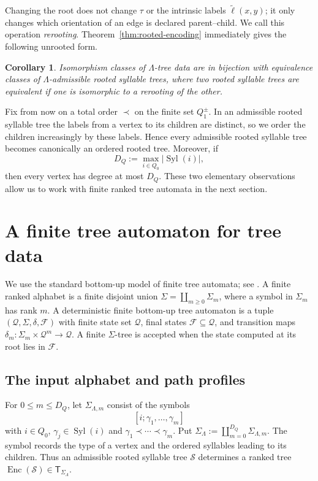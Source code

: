 \documentclass[11pt,a4paper]{amsart}
\newcommand{\Syl}{\operatorname{Syl}}
\newcommand{\Enc}{\operatorname{Enc}}
\theoremstyle{definition}
\theoremstyle{plain}
\newtheorem{corollary}[definition]{Corollary}
\theoremstyle{remark}
\numberwithin{equation}{section}
\begin{document}
Changing the root does not change $\tau$ or the intrinsic labels $\widetilde\ell(x,y)$; it only changes which orientation of an edge is declared parent--child. We call this operation \emph{rerooting}. Theorem~\ref{thm:rooted-encoding} immediately gives the following unrooted form.

\begin{corollary}\label{cor:rerooting}
Isomorphism classes of $\Lambda$-tree data are in bijection with equivalence classes of $\Lambda$-admissible rooted syllable trees, where two rooted syllable trees are equivalent if one is isomorphic to a rerooting of the other.
\end{corollary}

Fix from now on a total order $\prec$ on the finite set $Q_1^{\pm}$. In an admissible rooted syllable tree the labels from a vertex to its children are distinct, so we order the children increasingly by these labels. Hence every admissible rooted syllable tree becomes canonically an ordered rooted tree. Moreover, if
\[
D_Q:=\max_{i\in Q_0}|\Syl(i)|,
\]
then every vertex has degree at most $D_Q$. These two elementary observations allow us to work with finite ranked tree automata in the next section.

\section{A finite tree automaton for tree data}
\label{sec:automaton}

We use the standard bottom-up model of finite tree automata; see \cite{TATA}. A finite ranked alphabet is a finite disjoint union $\Sigma=\coprod_{m\geq 0}\Sigma_m$, where a symbol in $\Sigma_m$ has rank $m$. A deterministic finite bottom-up tree automaton is a tuple $(\mathcal Q,\Sigma,\delta,\mathcal F)$ with finite state set $\mathcal Q$, final states $\mathcal F\subseteq\mathcal Q$, and transition maps $\delta_m:\Sigma_m\times\mathcal Q^m\to\mathcal Q$. A finite $\Sigma$-tree is accepted when the state computed at its root lies in $\mathcal F$.

\subsection{The input alphabet and path profiles}

For $0\leq m\leq D_Q$, let $\Sigma_{\Lambda,m}$ consist of the symbols
\[
[i;\gamma_1,\ldots,\gamma_m]
\]
with $i\in Q_0$, $\gamma_j\in\Syl(i)$ and $\gamma_1\prec\cdots\prec\gamma_m$. Put $\Sigma_\Lambda:=\coprod_{m=0}^{D_Q}\Sigma_{\Lambda,m}$. The symbol records the type of a vertex and the ordered syllables leading to its children. Thus an admissible rooted syllable tree $\mathcal S$ determines a ranked tree $\Enc(\mathcal S)\in\mathsf T_{\Sigma_\Lambda}$.
\end{document}
